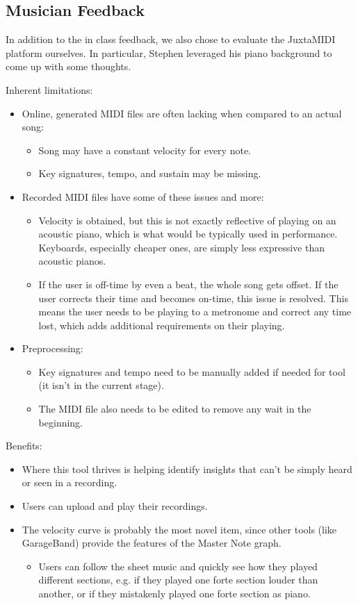 \documentclass[journal]{vgtc}                %
\begin{document}
\subsection{Musician Feedback}

In addition to the in class feedback, we also chose to evaluate the JuxtaMIDI
platform ourselves. In particular, Stephen leveraged his piano background to come up with
some thoughts.

Inherent limitations:
\begin{itemize}
  \item Online, generated MIDI files are often lacking when compared to an
  actual song:
  \begin{itemize}
    \item Song may have a constant velocity for every note.
    \item Key signatures, tempo, and sustain may be missing.
  \end{itemize}
  \item Recorded MIDI files have some of these issues and more:
  \begin{itemize}
    \item Velocity is obtained, but this is not exactly reflective of playing
    on an acoustic piano, which is what would be typically used in performance.
    Keyboards, especially cheaper ones, are simply less expressive than acoustic
    pianos.
    \item If the user is off-time by even a beat, the whole song gets offset.
    If the user corrects their time and becomes on-time, this issue is resolved.
    This means the user needs to be playing to a metronome and correct any time
    lost, which adds additional requirements on their playing.
  \end{itemize}
  \item Preprocessing:
  \begin{itemize}
    \item Key signatures and tempo need to be manually added if needed for tool
    (it isn’t in the current stage).
    \item The MIDI file also needs to be edited to remove any wait in the
    beginning.
  \end{itemize}
\end{itemize}


Benefits:
\begin{itemize}
  \item Where this tool thrives is helping identify insights that can’t be
  simply heard or seen in a recording.
  \item Users can upload and play their recordings.
  \item The velocity curve is probably the most novel item, since other tools
  (like GarageBand) provide the features of the Master Note graph.
  \begin{itemize}
    \item Users can follow the sheet music and quickly see how they played
    different sections, e.g. if they played one forte section louder than
    another, or if they mistakenly played one forte section as piano.
  \end{itemize}
\end{itemize}
\end{document}
